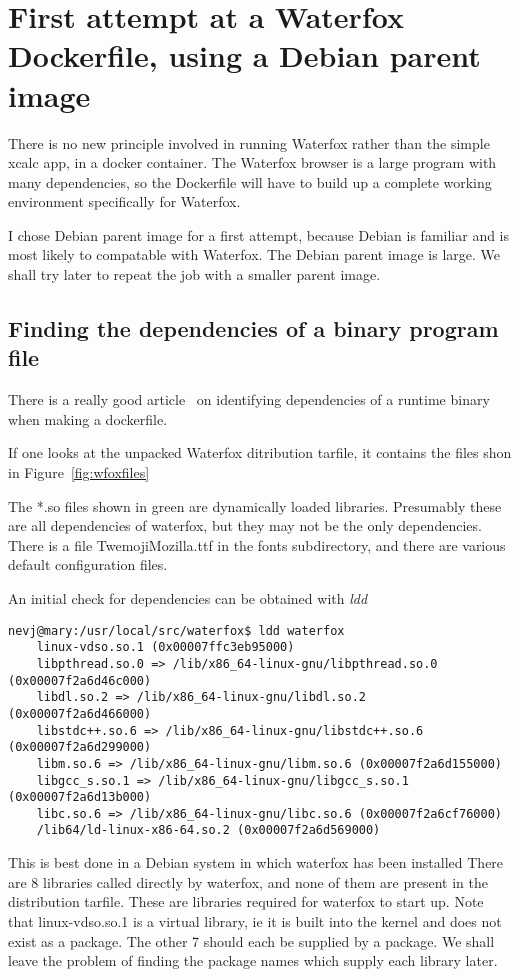 \documentclass{article}  %
\begin{document}
\section{First attempt at a Waterfox Dockerfile, using a  Debian parent image}
There is no new principle involved in running Waterfox rather than the simple xcalc app, in a docker container. The Waterfox browser is a large program with many dependencies, so the Dockerfile will have to build up a complete working environment specifically for Waterfox. 

I chose Debian parent image for a first attempt, because Debian is familiar and is most likely to compatable with Waterfox.  The Debian parent image is large. We shall try later to repeat the job with a smaller parent image. 

\subsection{Finding the dependencies of a binary program file}
There is a really good article~\cite{rehn:21} on identifying dependencies of a runtime binary when making a dockerfile.

If one looks at the unpacked Waterfox ditribution tarfile, it contains the files shon in Figure~\ref{fig:wfoxfiles}

The *.so files shown in green are dynamically loaded libraries. Presumably these are all dependencies of waterfox, but they may not be the only dependencies. There is a file TwemojiMozilla.ttf in the fonts subdirectory, and there are various default configuration files.

An initial check for dependencies can be obtained with {\em ldd}
\begin{verbatim}
nevj@mary:/usr/local/src/waterfox$ ldd waterfox
	linux-vdso.so.1 (0x00007ffc3eb95000)
	libpthread.so.0 => /lib/x86_64-linux-gnu/libpthread.so.0 (0x00007f2a6d46c000)
	libdl.so.2 => /lib/x86_64-linux-gnu/libdl.so.2 (0x00007f2a6d466000)
	libstdc++.so.6 => /lib/x86_64-linux-gnu/libstdc++.so.6 (0x00007f2a6d299000)
	libm.so.6 => /lib/x86_64-linux-gnu/libm.so.6 (0x00007f2a6d155000)
	libgcc_s.so.1 => /lib/x86_64-linux-gnu/libgcc_s.so.1 (0x00007f2a6d13b000)
	libc.so.6 => /lib/x86_64-linux-gnu/libc.so.6 (0x00007f2a6cf76000)
	/lib64/ld-linux-x86-64.so.2 (0x00007f2a6d569000)
\end{verbatim}
This is best done in a Debian system in which waterfox has been installed
There are 8 libraries called directly by waterfox, and none of them are present in the distribution tarfile. These are libraries required for waterfox to start up. Note that linux-vdso.so.1 is a virtual library, ie it is built into the kernel and does not exist as a package. The other 7 should each be supplied by a package. We shall leave the problem of finding the package names which supply each library later.
\end{document}
